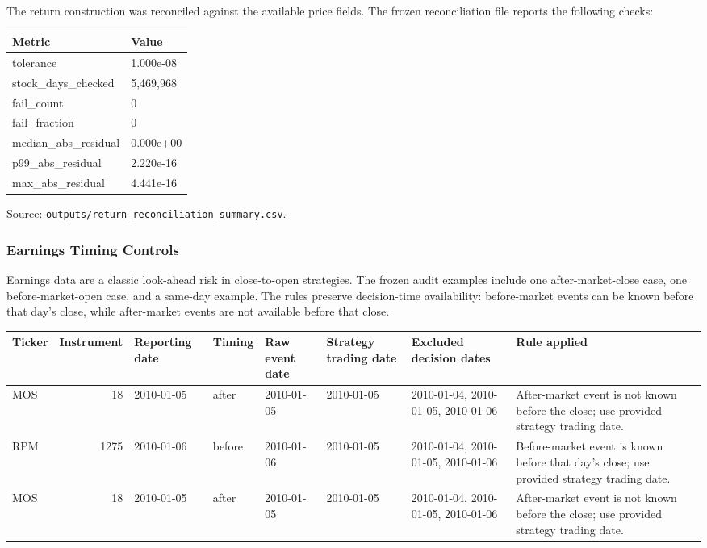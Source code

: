 \documentclass[
]{article}
\begin{document}
The return construction was reconciled against the available price
fields. The frozen reconciliation file reports the following checks:

\begin{longtable}[]{@{}ll@{}}
\toprule
Metric & Value \\
\midrule
\endhead
tolerance & 1.000e-08 \\
stock\_days\_checked & 5,469,968 \\
fail\_count & 0 \\
fail\_fraction & 0 \\
median\_abs\_residual & 0.000e+00 \\
p99\_abs\_residual & 2.220e-16 \\
max\_abs\_residual & 4.441e-16 \\
\bottomrule
\end{longtable}

Source: \texttt{outputs/return\_reconciliation\_summary.csv}.

\hypertarget{earnings-timing-controls}{%
\subsubsection{Earnings Timing
Controls}\label{earnings-timing-controls}}

Earnings data are a classic look-ahead risk in close-to-open strategies.
The frozen audit examples include one after-market-close case, one
before-market-open case, and a same-day example. The rules preserve
decision-time availability: before-market events can be known before
that day's close, while after-market events are not available before
that close.

\begin{longtable}[]{@{}lrllllll@{}}
\toprule
Ticker & Instrument & Reporting date & Timing & Raw event date &
Strategy trading date & Excluded decision dates & Rule applied \\
\midrule
\endhead
MOS & 18 & 2010-01-05 & after & 2010-01-05 & 2010-01-05 & 2010-01-04,
2010-01-05, 2010-01-06 & After-market event is not known before the
close; use provided strategy trading date. \\
RPM & 1275 & 2010-01-06 & before & 2010-01-06 & 2010-01-05 & 2010-01-04,
2010-01-05, 2010-01-06 & Before-market event is known before that day's
close; use provided strategy trading date. \\
MOS & 18 & 2010-01-05 & after & 2010-01-05 & 2010-01-05 & 2010-01-04,
2010-01-05, 2010-01-06 & After-market event is not known before the
close; use provided strategy trading date. \\
\bottomrule
\end{longtable}
\end{document}
